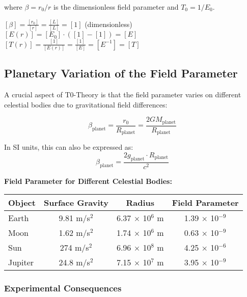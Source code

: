 \documentclass[12pt,a4paper]{article}
\theoremstyle{definition}
\begin{document}
where $\beta = r_0/r$ is the dimensionless field parameter and $T_0 = 1/E_0$.

\begin{einheitencheck}
	$[\beta] = \frac{[r_0]}{[r]} = \frac{[L]}{[L]} = [1]$ (dimensionless) \checkmark\\
	$[E(r)] = [E_0] \cdot ([1] - [1]) = [E]$ \checkmark\\
	$[T(r)] = \frac{[1]}{[E(r)]} = \frac{[1]}{[E]} = [E^{-1}] = [T]$ \checkmark
\end{einheitencheck}

\subsection{Planetary Variation of the Field Parameter}

A crucial aspect of T0-Theory is that the field parameter varies on different celestial bodies due to gravitational field differences:

\begin{equation}
	\boxed{\beta_{\text{planet}} = \frac{r_0}{R_{\text{planet}}} = \frac{2GM_{\text{planet}}}{R_{\text{planet}}}}
\end{equation}

In SI units, this can also be expressed as:
\begin{equation}
	\beta_{\text{planet}} = \frac{2g_{\text{planet}} \cdot R_{\text{planet}}}{c^2}
\end{equation}

\noindent
\textbf{Field Parameter for Different Celestial Bodies:}

\begin{center}
	\begin{tabular}{lccc}
		\toprule
		\textbf{Object} & \textbf{Surface Gravity} & \textbf{Radius} & \textbf{Field Parameter} \\
		\midrule
		Earth & 9.81 m/s$^2$ & 6.37 $\times$ 10$^6$ m & 1.39 $\times$ 10$^{-9}$ \\
		Moon & 1.62 m/s$^2$ & 1.74 $\times$ 10$^6$ m & 0.63 $\times$ 10$^{-9}$ \\
		Sun & 274 m/s$^2$ & 6.96 $\times$ 10$^8$ m & 4.25 $\times$ 10$^{-6}$ \\
		Jupiter & 24.8 m/s$^2$ & 7.15 $\times$ 10$^7$ m & 3.95 $\times$ 10$^{-9}$ \\
		\bottomrule
	\end{tabular}
\end{center}

\subsubsection{Experimental Consequences}
\end{document}
